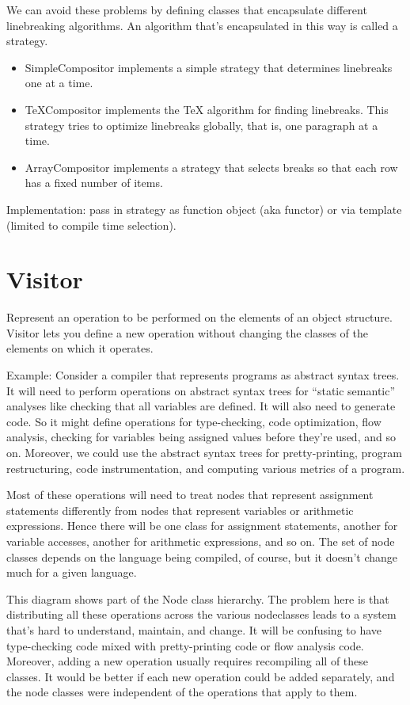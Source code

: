 \documentclass[11pt]{report}
\begin{document}
We can avoid these problems by defining classes that encapsulate
different linebreaking algorithms. An algorithm that's 
encapsulated in this way is called a strategy.

\begin{itemize}
\item SimpleCompositor implements a simple strategy that determines linebreaks one at a time.
\item TeXCompositor implements the TeX algorithm for finding linebreaks. 
      This strategy tries to optimize linebreaks globally, that is, one paragraph at a time.
\item ArrayCompositor implements a strategy that selects breaks so that each row has a 
fixed number of items. 
\end{itemize}

Implementation: pass in strategy as function object (aka functor) or via template (limited to compile time selection).

\section{Visitor}

 Represent an operation to be performed on the elements of an object
structure. Visitor lets you define a new operation without changing the
classes of the elements on which it operates.

Example: Consider a compiler that represents programs as abstract syntax trees.
It will need to perform operations on abstract syntax trees for ``static semantic'' analyses like 
checking that all variables are defined. It will also need to generate code. So it might define 
operations for type-checking, code optimization, flow analysis, checking for variables being assigned values before they're used, and so on. Moreover, we could use the abstract syntax trees for pretty-printing, 
program restructuring, code instrumentation, and computing various metrics of a program.

Most of these operations will need to treat nodes that represent assignment statements differently from nodes that 
represent variables or arithmetic expressions. Hence there will be one class for assignment
statements, another for variable accesses, another for arithmetic
expressions, and so on. 
The set of node classes depends on the language being compiled, of course, but it doesn't change much for a given
language.

This diagram shows part of the Node class hierarchy. The problem here
is that distributing all these operations across the various nodeclasses leads to a system that's hard to understand, maintain, and change. It will be confusing to have
type-checking code mixed with
pretty-printing code or flow analysis code. Moreover, adding a new
operation usually requires recompiling all of these classes. It would be better if each new operation 
could be added separately, and the node classes were independent of the operations that apply to them.
\end{document}
